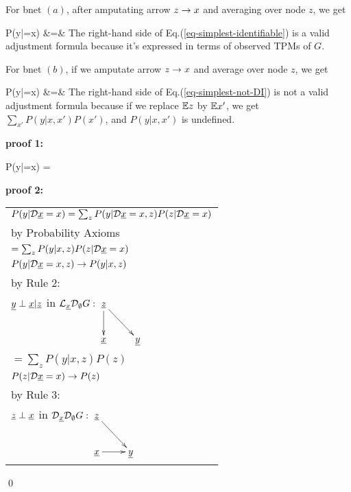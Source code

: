 For bnet $(a)$, after amputating arrow
$z\rightarrow x$ and averaging over node $z$,
we get

\beqa
P(y|\cald\rvx=x)
&=&
\label{eq-simplest-identifiable}
\eeqa
The right-hand
side of Eq.(\ref{eq-simplest-identifiable})
is a valid
adjustment formula
because it's expressed in terms
of observed TPMs of $G$.

For bnet $(b)$,
if we amputate arrow
$z\rightarrow x$
and average over node $z$,
we get

\beqa
P(y|\cald \rvx =x)
&=&
\label{eq-simplest-not-DI}
\eeqa
The right-hand
side of Eq.(\ref{eq-simplest-not-DI})
is not a valid
adjustment formula
because
if we replace ${ \mathbb{E}} z$ by ${ \mathbb{E}} x' $, we get 
$\sum_{x'}P(y|x, x')P(x')$,
and $P(y|x, x')$ is undefined.






\begin{claim}
\label{cl-decBackDoor}
\decBackDoor
\end{claim}

\proof

{\bf * proof 1:}

\beq
P(y|\cald\rvx=x)
=
\eeq


{\bf * proof 2:}
\begin{longtable}{l}
\color{red}
$P(y|\cald\rvx=x)
=
\sum_z
P(y|\cald\rvx=x, z)
P(z|\cald\rvx=x)$
\\
\quad by Probability Axioms
\\
\color{red}
$=\sum_z
P(y|x, z)
P(z|\cald\rvx=x)$
\\
\quad $P(y|\cald \rvx=x, z)\rarrow
P(y|x, z)$
\\
\quad  by Rule 2:
\\
\quad
$\rvy\perp\rvx|\rvz$ in
$\call_\rvx\cald_\emptyset G:
\xymatrix{
\rvz\ar[d]\ar[rd]
\\
\rvx
&\rvy
}$
\\
\color{red}
$=\sum_z
P(y|x, z)
P(z)$
\\
\quad $P(z|\cald \rvx=x)\rarrow
P(z)$
\\
\quad  by Rule 3:
\\
\quad
$\rvz\perp \rvx$ in
$\cald_\rvx \cald_\emptyset G:
\xymatrix{
\rvz\ar[rd]
\\
\rvx\ar[r]
&\rvy
}
$
\end{longtable}
\qed





